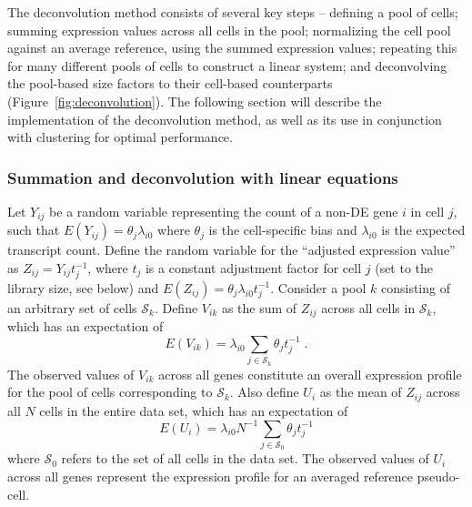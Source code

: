 \documentclass{bmcart}
\newcommand{\revised}[1]{#1}
\begin{document}
The deconvolution method consists of several key steps --
    defining a pool of cells;
    summing expression values across all cells in the pool;
    normalizing the cell pool against an average reference, using the summed expression values;
    repeating this for many different pools of cells to construct a linear system;
    and deconvolving the pool-based size factors to their cell-based counterparts (Figure~\ref{fig:deconvolution}).
The following section will describe the implementation of the deconvolution method, as well as its use in conjunction with clustering for optimal performance.

\subsubsection*{Summation and deconvolution with linear equations}
\revised{Let $Y_{ij}$ be a random variable representing the count of a non-DE gene $i$ in cell $j$, such that $E(Y_{ij})=\theta_j\lambda_{i0}$ where $\theta_j$ is the cell-specific bias and $\lambda_{i0}$ is the expected transcript count.
Define the random variable for the ``adjusted expression value'' as $Z_{ij} = Y_{ij}t_j^{-1}$, where $t_j$ is a constant adjustment factor for cell $j$ (set to the library size, see below) and $E(Z_{ij}) =\theta_j\lambda_{i0} t_j^{-1}$.
Consider a pool $k$ consisting of an arbitrary set of cells $\mathcal{S}_k$.
Define $V_{ik}$ as the sum of $Z_{ij}$ across all cells in $\mathcal{S}_k$, which has an expectation of 
\[
    E(V_{ik}) = \lambda_{i0} \sum_{j \in \mathcal{S}_k} \theta_j t_j^{-1}\;.
\]
The observed values of $V_{ik}$ across all genes constitute an overall expression profile for the pool of cells corresponding to $\mathcal{S}_k$.
Also define $U_{i}$ as the mean of $Z_{ij}$ across all $N$ cells in the entire data set, which has an expectation of
\[
    E(U_i) = \lambda_{i0}N^{-1} \sum_{j \in \mathcal{S}_0} \theta_j t_j^{-1}
\]
where $\mathcal{S}_0$ refers to the set of all cells in the data set.
The observed values of $U_{i}$ across all genes represent the expression profile for an averaged reference pseudo-cell.}
\end{document}
